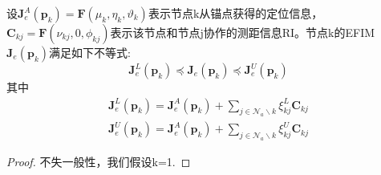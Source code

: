 \begin{proposition}
设$\bm{J}_e^A(\bm{p}_k)=\bm{F}(\mu_k,\eta_k,\vartheta_k)$表示节点k从锚点获得的定位信息，$\bm{C}_{kj}=\bm{F}(\nu_{kj},0,\phi_{kj})$表示该节点和节点j协作的测距信息RI。节点k的EFIM $\bm{J}_e(\bm{p}_k)$满足如下不等式:
\[
\bm{J}_e^L(\bm{p}_k) \preceq \bm{J}_e(\bm{p}_k) \preceq \bm{J}_e^U(\bm{p}_k)
\]
其中
\begin{eqnarray}
\bm{J}_e^L(\bm{p}_k)=\bm{J}_e^A(\bm{p}_k)+\sum_{j\in \mathcal{N}_a \backslash {k}} \xi_{kj}^L \bm{C}_{kj}\\
\bm{J}_e^U(\bm{p}_k)=\bm{J}_e^A(\bm{p}_k)+\sum_{j\in \mathcal{N}_a \backslash {k}} \xi_{kj}^U \bm{C}_{kj}
\end{eqnarray}
\end{proposition}
\begin{proof}
不失一般性，我们假设k=1.


\end{proof}
